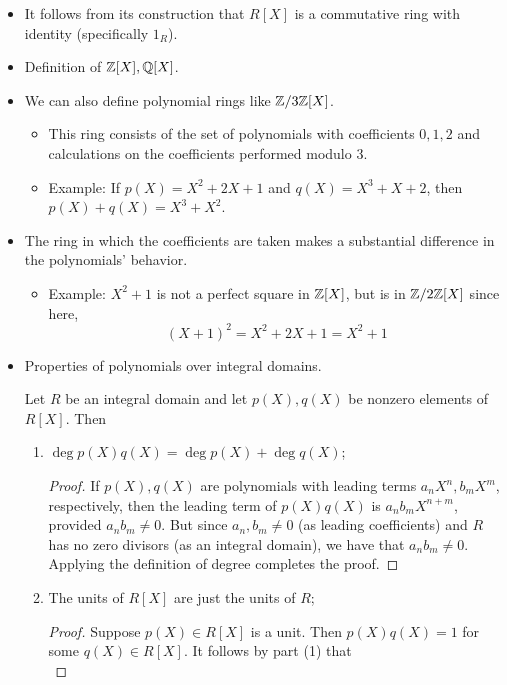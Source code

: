 \documentclass[../notes.tex]{subfiles}
\begin{document}
\begin{itemize}
    \item It follows from its construction that $R[X]$ is a commutative ring with identity (specifically $1_R$).
    \item Definition of $\mathbb{Z}[X],\mathbb{Q}[X]$.
    \item We can also define polynomial rings like $\mathbb{Z}/3\mathbb{Z}[X]$.
    \begin{itemize}
        \item This ring consists of the set of polynomials with coefficients $0,1,2$ and calculations on the coefficients performed modulo 3.
        \item Example: If $p(X)=X^2+2X+1$ and $q(X)=X^3+X+2$, then $p(X)+q(X)=X^3+X^2$.
    \end{itemize}
    \item The ring in which the coefficients are taken makes a substantial difference in the polynomials' behavior.
    \begin{itemize}
        \item Example: $X^2+1$ is not a perfect square in $\mathbb{Z}[X]$, but is in $\mathbb{Z}/2\mathbb{Z}[X]$ since here,
        \begin{equation*}
            (X+1)^2 = X^2+2X+1 = X^2+1
        \end{equation*}
    \end{itemize}
    \item Properties of polynomials over integral domains.
    \begin{proposition}\label{prp:7.4}
        Let $R$ be an integral domain and let $p(X),q(X)$ be nonzero elements of $R[X]$. Then
        \begin{enumerate}
            \item $\deg p(X)q(X)=\deg p(X)+\deg q(X)$;
            \begin{proof}
                If $p(X),q(X)$ are polynomials with leading terms $a_nX^n,b_mX^m$, respectively, then the leading term of $p(X)q(X)$ is $a_nb_mX^{n+m}$, provided $a_nb_m\neq 0$. But since $a_n,b_m\neq 0$ (as leading coefficients) and $R$ has no zero divisors (as an integral domain), we have that $a_nb_m\neq 0$. Applying the definition of degree completes the proof.
            \end{proof}
            \item The units of $R[X]$ are just the units of $R$;
            \begin{proof}
                Suppose $p(X)\in R[X]$ is a unit. Then $p(X)q(X)=1$ for some $q(X)\in R[X]$. It follows by part (1) that
                \begin{equation*}

\end{equation*}
\end{proof}
\end{enumerate}
\end{proposition}
\end{itemize}
\end{document}
